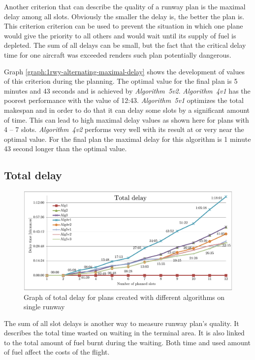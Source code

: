 Another criterion that can describe the quality of a runway plan is the maximal delay among all slots. Obviously the smaller the delay is, the better the plan is. This criterion criterion can be used to prevent the situation in which one plane would give the priority to all others and would wait until its supply of fuel is depleted. The sum of all delays can be small, but the fact that the critical delay time for one aircraft was exceeded renders such plan potentially dangerous.

Graph \ref{graph:1rwy-alternating-maximal-delay} shows the development of values of this criterion during the planning. The optimal value for the final plan is 5 minutes and 43 seconds and is achieved by {\em Algorithm~5v2}. {\em Algorithm~4v1} has the poorest performance with the value of 12:43. {\em Algorithm~5v1} optimizes the total makespan and in order to do that it can delay some slots by a significant amount of time. This can lead to high maximal delay values as shown here for plans with 4 – 7 slots. {\em Algorithm~4v2} performs very well with its result at or very near the optimal value. For the final plan the maximal delay for this algorithm is 1 minute 43 second longer than the optimal value.

\subsection{Total delay}

\begin{figure}[h]
    \centering
    \includegraphics[width=\textwidth]{graphs/1rwy-alternating-total-delay.pdf}
    \caption{Graph of total delay for plans created with different algorithms on single runway}
    \label{graph:1rwy-alternating-total-delay}
\end{figure}

The sum of all slot delays is another way to measure runway plan's quality. It describes the total time wasted on waiting in the terminal area. It is also linked to the total amount of fuel burnt during the waiting. Both time and used amount of fuel affect the costs of the flight.

